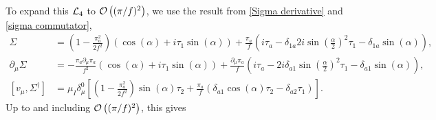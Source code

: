 \documentclass{article}
\begin{document}
To expand this $\Ell_4$ to $\Oh[2]{(\pi/f)}$, we use the result from \autoref{Sigma derivative} and \autoref{sigma commutator},
\begin{align*}
    \Sigma & =
    \left(
       1 
       - \frac{\pi_a^2}{2f^2}
   \right)
   (\cos(\alpha) + i \tau_1 \sin(\alpha))
   +  \frac{\pi_a}{f}    \left(
       i\tau_a 
       - \delta_{1a} 2i \sin(\frac{\alpha}{2})^2 \tau_1 
       - \delta_{1a} \sin(\alpha)
   \right), \\
    \partial_\mu \Sigma 
    & = 
    - \frac{\pi_a \partial_\mu \pi_a}{f^2}
    \left(\cos(\alpha) + i \tau_1 \sin(\alpha)\right)
    + \frac{\partial_\mu \pi_a}{f}
    \left(
        i\tau_a 
        -2 i \delta_{a1} \sin(\frac{\alpha}{2})^2 \tau_1 
        - \delta_{a1}\sin(\alpha)\right), \\
    [v_\mu, \Sigma^\dagger] 
    & =
    \mu_I \delta^0_\mu
    \left[
        \left( 1 - \frac{\pi_a^2}{2f^2} \right) \sin(\alpha) \tau_2
        + \frac{\pi_a}{f}
        \left(
            \delta_{a1} \cos(\alpha) \tau_2 - \delta_{a2} \tau_1
        \right)
    \right].
    \end{align*}
Up to and including $\Oh{(\pi/f)}$, this gives
\end{document}
